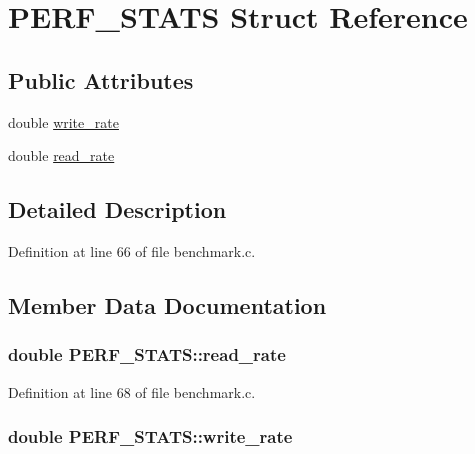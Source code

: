 \hypertarget{struct_p_e_r_f___s_t_a_t_s}{}\section{P\+E\+R\+F\+\_\+\+S\+T\+A\+TS Struct Reference}
\label{struct_p_e_r_f___s_t_a_t_s}
\subsection*{Public Attributes}
\begin{DoxyCompactItemize}
\item 
double \hyperlink{struct_p_e_r_f___s_t_a_t_s_a9f337810fed6360cf264e064a1e81fd0}{write\+\_\+rate}
\item 
double \hyperlink{struct_p_e_r_f___s_t_a_t_s_a878c8dc6e89e6f7e263d8e8fddc03e28}{read\+\_\+rate}
\end{DoxyCompactItemize}


\subsection{Detailed Description}


Definition at line 66 of file benchmark.\+c.



\subsection{Member Data Documentation}
\subsubsection[{\texorpdfstring{read\+\_\+rate}{read_rate}}]{\setlength{\rightskip}{0pt plus 5cm}double P\+E\+R\+F\+\_\+\+S\+T\+A\+T\+S\+::read\+\_\+rate}\hypertarget{struct_p_e_r_f___s_t_a_t_s_a878c8dc6e89e6f7e263d8e8fddc03e28}{}\label{struct_p_e_r_f___s_t_a_t_s_a878c8dc6e89e6f7e263d8e8fddc03e28}


Definition at line 68 of file benchmark.\+c.

\subsubsection[{\texorpdfstring{write\+\_\+rate}{write_rate}}]{\setlength{\rightskip}{0pt plus 5cm}double P\+E\+R\+F\+\_\+\+S\+T\+A\+T\+S\+::write\+\_\+rate}\hypertarget{struct_p_e_r_f___s_t_a_t_s_a9f337810fed6360cf264e064a1e81fd0}{}\label{struct_p_e_r_f___s_t_a_t_s_a9f337810fed6360cf264e064a1e81fd0}


